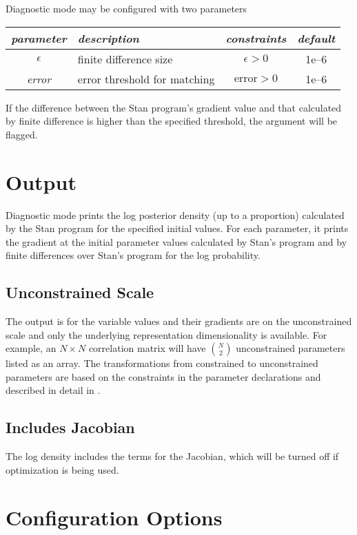 Diagnostic mode may be configured with two parameters
%
\begin{center}
\begin{tabular}{c|lcc}
{\it parameter} & {\it description} & {\it constraints} & {\it
  default}
\\ \hline
{\it $\epsilon$} & finite difference size & $\epsilon > 0$ & 1e--6
\\
{\it error} & error threshold for matching & $\mbox{error} > 0$ & 1e--6
\end{tabular}
\end{center}
%
If the difference between the Stan program's gradient value and that
calculated by finite difference is higher than the specified
threshold, the argument will be flagged.

\section{Output}

Diagnostic mode prints the log posterior density (up to a proportion)
calculated by the Stan program for the specified initial values. For
each parameter, it prints the gradient at the initial parameter values
calculated by Stan's program and by finite differences over Stan's
program for the log probability.  

\subsection{Unconstrained Scale}

The output is for the variable values and their gradients are on the
unconstrained scale and only the underlying representation
dimensionality is available. For example, an $N \times N$ correlation
matrix will have ${N \choose 2}$ unconstrained parameters listed as an
array.  The transformations from constrained to unconstrained
parameters are based on the constraints in the parameter declarations
and described in detail in .

\subsection{Includes Jacobian}

The log density includes the terms for the Jacobian, which will be
turned off if optimization is being used.

\section{Configuration Options}

